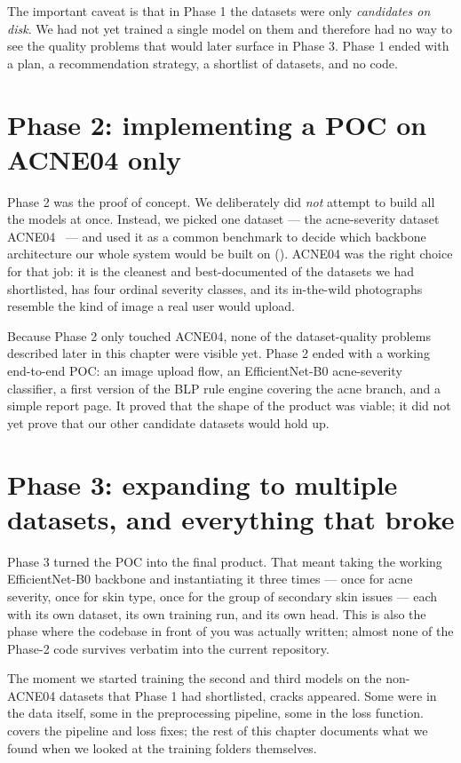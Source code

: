 \documentclass[11pt,a4paper,oneside]{report}
\newcommand{\effnet}{EfficientNet-B0\xspace}
\begin{document}
The important caveat is that in Phase 1 the datasets were only
\emph{candidates on disk}. We had not yet trained a single model on
them and therefore had no way to see the quality problems that
would later surface in Phase 3. Phase 1 ended with a plan, a
recommendation strategy, a shortlist of datasets, and no code.

\section{Phase 2: implementing a POC on ACNE04 only}

Phase 2 was the proof of concept. We deliberately did \emph{not}
attempt to build all the models at once. Instead, we picked one
dataset --- the acne-severity dataset ACNE04~\cite{wu2019acne04} ---
and used it as a common benchmark to decide which backbone
architecture our whole system would be built on
(). ACNE04 was the right choice for that job:
it is the cleanest and best-documented of the datasets we had
shortlisted, has four ordinal severity classes, and its
in-the-wild photographs resemble the kind of image a real user
would upload.

Because Phase 2 only touched ACNE04, none of the dataset-quality
problems described later in this chapter were visible yet. Phase 2
ended with a working end-to-end POC: an image upload flow, an
\effnet acne-severity classifier, a first version of the BLP rule
engine covering the acne branch, and a simple report page. It
proved that the shape of the product was viable; it did not yet
prove that our other candidate datasets would hold up.

\section{Phase 3: expanding to multiple datasets, and everything that broke}

Phase 3 turned the POC into the final product. That meant taking
the working \effnet backbone and instantiating it three times ---
once for acne severity, once for skin type, once for the group of
secondary skin issues --- each with its own dataset, its own
training run, and its own head. This is also the phase where the
codebase in front of you was actually written; almost none of the
Phase-2 code survives verbatim into the current repository.

The moment we started training the second and third models on the
non-ACNE04 datasets that Phase 1 had shortlisted, cracks appeared.
Some were in the data itself, some in the preprocessing pipeline,
some in the loss function.  covers the pipeline
and loss fixes; the rest of this chapter documents what we found
when we looked at the training folders themselves.
\end{document}

